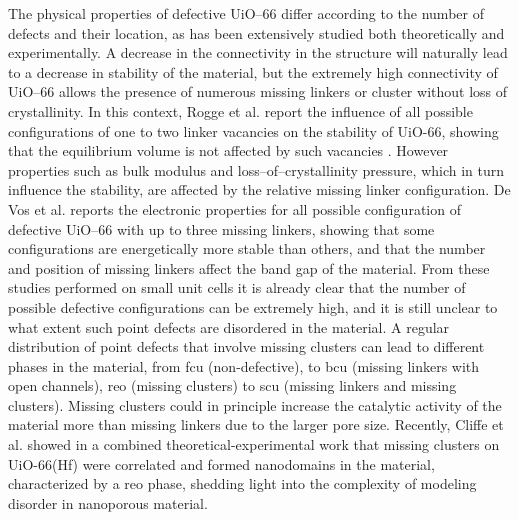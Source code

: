 \npar
The physical properties of defective UiO--66 differ according to the number of defects and their location, as has been extensively studied both theoretically and experimentally. A decrease in the connectivity in the structure will naturally lead to a decrease in stability of the material, but the extremely high connectivity of UiO--66 allows the presence of numerous missing linkers or cluster without loss of crystallinity. 
In this context, Rogge et al. report the influence of all possible configurations of one to two linker vacancies on the stability of UiO-66, showing that the equilibrium volume is not affected by such vacancies \cite{rogge2016thermodynamic}. However properties such as bulk modulus and loss--of--crystallinity pressure, which in turn influence the stability, are affected by the relative missing linker configuration. 
De Vos et al.\cite{devos2017missing} reports the electronic properties for all possible configuration of defective UiO--66 with up to three missing linkers, showing that some configurations are energetically more stable than others, and that the number and position of missing linkers affect the band gap of the material. From these studies performed on small unit cells it is already clear that the number of possible defective configurations can be extremely high, and it is still unclear to what extent such point defects are disordered in the material. A regular distribution of point defects that involve missing clusters can lead to different phases in the material, from fcu (non-defective), to bcu (missing linkers with open channels), reo (missing clusters) to scu (missing linkers and missing clusters). Missing clusters could in principle increase the catalytic activity of the material more than missing linkers due to the larger pore size. Recently, Cliffe et al. \cite{cliffe2014correlated} showed in a combined theoretical-experimental work that missing clusters on UiO-66(Hf) were correlated and formed nanodomains in the material, characterized by a reo phase, shedding light into the complexity of modeling disorder in nanoporous material. 

